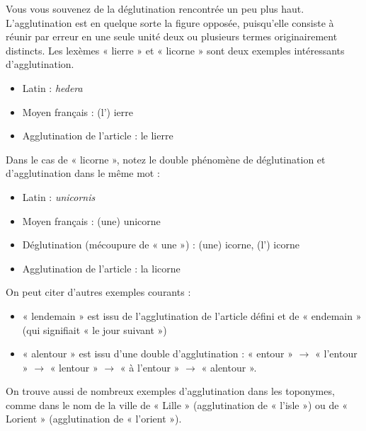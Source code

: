 Vous vous souvenez de la déglutination rencontrée un peu plus haut. L’agglutination est en quelque sorte la figure opposée, puisqu’elle consiste à réunir par erreur en une seule unité deux ou plusieurs termes originairement distincts. Les lexèmes « lierre » et « licorne » sont deux exemples intéressants d’agglutination.
\begin{itemize}
\item Latin : \textit{hedera}
\item Moyen français : (l’) ierre
\item Agglutination de l’article : le lierre
\end{itemize}
Dans le cas de « licorne », notez le double phénomène de déglutination et d’agglutination dans le même mot :
\begin{itemize}
\item Latin : \textit{unicornis}
\item Moyen français : (une) unicorne
\item Déglutination (mécoupure de « une ») : (une) icorne, (l’) icorne
\item Agglutination de l’article : la licorne
\end{itemize}
On peut citer d’autres exemples courants :
\begin{itemize}
\item « lendemain » est issu de l’agglutination de l’article défini et de « endemain » (qui signifiait « le jour suivant »)
\item « alentour » est issu d’une double d’agglutination : « entour » $\rightarrow$ « l’entour » $\rightarrow$ « lentour » $\rightarrow$ « à l’entour » $\rightarrow$ « alentour ».
\end{itemize}
On trouve aussi de nombreux exemples d’agglutination dans les toponymes, comme dans le nom de la ville de « Lille » (agglutination de « l’isle ») ou de « Lorient » (agglutination de « l’orient »).

